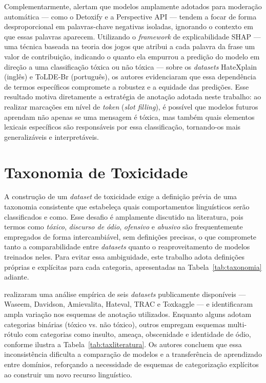 \documentclass{eic-bcc-tcc}
\begin{document}
Complementarmente, \cite{melo2025torna} alertam que modelos amplamente adotados para moderação automática — como o Detoxify e a Perspective API — tendem a focar de forma desproporcional em palavras-chave negativas isoladas, ignorando o contexto em que essas palavras aparecem. Utilizando o \textit{framework} de explicabilidade SHAP — uma técnica baseada na teoria dos jogos que atribui a cada palavra da frase um valor de contribuição, indicando o quanto ela empurrou a predição do modelo em direção a uma classificação tóxica ou não tóxica — sobre os \textit{datasets} HateXplain (inglês) e ToLDE-Br (português), os autores evidenciaram que essa dependência de termos específicos compromete a robustez e a equidade das predições. Esse resultado motiva diretamente a estratégia de anotação adotada neste trabalho: ao realizar marcações em nível de \textit{token} (\textit{slot filling}), é possível que modelos futuros aprendam não apenas se uma mensagem é tóxica, mas também quais elementos lexicais específicos são responsáveis por essa classificação, tornando-os mais generalizáveis e interpretáveis.

\section{Taxonomia de Toxicidade}
\label{sec:taxonomia}

A construção de um \textit{dataset} de toxicidade exige a definição prévia de uma taxonomia consistente que estabeleça quais comportamentos linguísticos serão classificados e como. Esse desafio é amplamente discutido na literatura, pois termos como \textit{tóxico}, \textit{discurso de ódio}, \textit{ofensivo} e \textit{abusivo} são frequentemente empregados de forma intercambiável, sem definições precisas, o que compromete tanto a comparabilidade entre \textit{datasets} quanto o reaproveitamento de modelos treinados neles. Para evitar essa ambiguidade, este trabalho adota definições próprias e explícitas para cada categoria, apresentadas na Tabela~\ref{tab:taxonomia} adiante.

\cite{fortuna2020toxic} realizaram uma análise empírica de seis \textit{datasets} publicamente disponíveis — Waseem, Davidson, Amievalita, Hateval, TRAC e Toxkaggle — e identificaram ampla variação nos esquemas de anotação utilizados. Enquanto alguns adotam categorias binárias (tóxico vs. não tóxico), outros empregam esquemas multi-rótulo com categorias como insulto, ameaça, obscenidade e identidade de ódio, conforme ilustra a Tabela~\ref{tab:taxliteratura}. Os autores concluem que essa inconsistência dificulta a comparação de modelos e a transferência de aprendizado entre domínios, reforçando a necessidade de esquemas de categorização explícitos ao construir um novo recurso linguístico.
\end{document}
